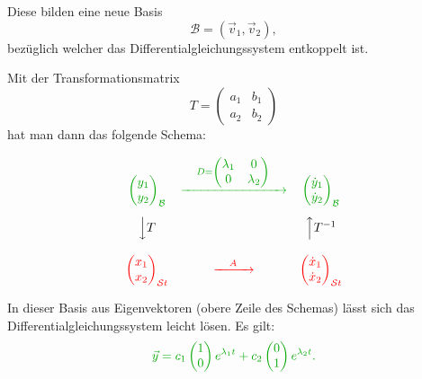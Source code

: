 Diese bilden eine neue Basis
\[
    \mathcal{B}=(\vec{v}_1,\vec{v}_2),
\]
bezüglich welcher das Differentialgleichungssystem entkoppelt ist.

Mit der Transformationsmatrix
\[
    T=
    \begin{pmatrix}
        a_1 & b_1 \\
        a_2 & b_2
    \end{pmatrix}
\]
hat man dann das folgende Schema:

\[
    \begin{array}{ccc}
        {\color{green!65!black}
            \begin{pmatrix} y_1 \\ y_2 \end{pmatrix}_{\mathcal{B}}}
         &
        {\color{green!65!black}
            \xrightarrow{\quad
                D=\begin{pmatrix}
                    \lambda_1 & 0         \\
                    0         & \lambda_2
                \end{pmatrix}
                \quad}}
         &
        {\color{green!65!black}
            \begin{pmatrix} \dot y_1 \\ \dot y_2 \end{pmatrix}_{\mathcal{B}}}
        \\[1.5em]
        \Big\downarrow T
         &   &
        \Big\uparrow T^{-1}
        \\[1.5em]
        {\color{red}
            \begin{pmatrix} x_1 \\ x_2 \end{pmatrix}_{\mathcal{S}t}}
         &
        {\color{red}\xrightarrow{\quad A\quad}}
         &
        {\color{red}
            \begin{pmatrix} \dot x_1 \\ \dot x_2 \end{pmatrix}_{\mathcal{S}t}}
    \end{array}
\]

In dieser Basis aus Eigenvektoren (obere Zeile des Schemas)
lässt sich das Differentialgleichungssystem leicht lösen.
Es gilt:
\[
    {\color{green!65!black}
        \vec{y}
        = c_1
        \begin{pmatrix}1\\0\end{pmatrix}e^{\lambda_1t}
        + c_2
        \begin{pmatrix}0\\1\end{pmatrix}e^{\lambda_2t}.}
\]

